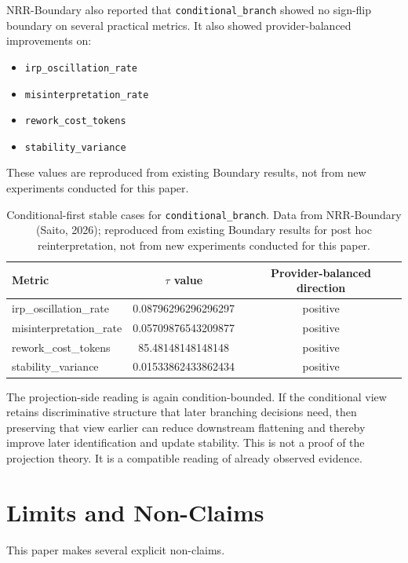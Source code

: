 \documentclass[11pt,a4paper]{article}
\begin{document}
NRR-Boundary also reported that \texttt{conditional\_branch} showed no sign-flip boundary on several practical metrics. It also showed provider-balanced improvements on:
\begin{itemize}
  \item \texttt{irp\_oscillation\_rate}
  \item \texttt{misinterpretation\_rate}
  \item \texttt{rework\_cost\_tokens}
  \item \texttt{stability\_variance}
\end{itemize}

These values are reproduced from existing Boundary results, not from new experiments conducted for this paper.

\begin{table}[h]
\centering
\small
\begin{tabular}{p{4.3cm}cc}
\toprule
Metric & $\tau$ value & Provider-balanced direction \\
\midrule
irp\_oscillation\_rate & 0.08796296296296297 & positive \\
misinterpretation\_rate & 0.05709876543209877 & positive \\
rework\_cost\_tokens & 85.48148148148148 & positive \\
stability\_variance & 0.01533862433862434 & positive \\
\bottomrule
\end{tabular}
\caption{Conditional-first stable cases for \texttt{conditional\_branch}. Data from NRR-Boundary (Saito, 2026); reproduced from existing Boundary results for post hoc reinterpretation, not from new experiments conducted for this paper.}
\label{tab:boundary_conditional_first}
\end{table}

The projection-side reading is again condition-bounded. If the conditional view retains discriminative structure that later branching decisions need, then preserving that view earlier can reduce downstream flattening and thereby improve later identification and update stability. This is not a proof of the projection theory. It is a compatible reading of already observed evidence.

\section{Limits and Non-Claims}
\label{sec:limits}

This paper makes several explicit non-claims.
\end{document}
